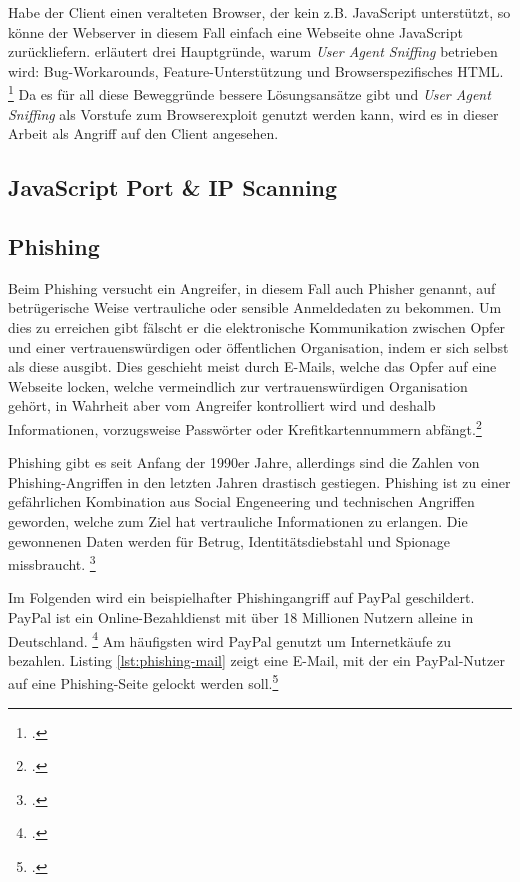 Habe der Client einen veralteten Browser, der kein z.B. JavaScript unterstützt, so könne der Webserver in diesem Fall einfach eine Webseite ohne JavaScript zurückliefern.
\cite{mdnBrowserDetection} erläutert drei Hauptgründe, warum \textit{User Agent Sniffing} betrieben wird: Bug-Workarounds, Feature-Unterstützung und Browserspezifisches HTML.
\footcite[Vgl.][]{mdnBrowserDetection}
Da es für all diese Beweggründe bessere Lösungsansätze gibt und \textit{User Agent Sniffing} als Vorstufe zum Browserexploit genutzt werden kann, wird es in dieser Arbeit als Angriff auf den Client angesehen.

\subsection{JavaScript Port \& IP Scanning}


\subsection{Phishing}

Beim Phishing versucht ein Angreifer, in diesem Fall auch Phisher genannt, auf betrügerische Weise vertrauliche oder sensible Anmeldedaten zu bekommen. Um dies zu erreichen gibt fälscht er die elektronische Kommunikation zwischen Opfer und einer vertrauenswürdigen oder öffentlichen Organisation, indem er sich selbst als diese ausgibt. Dies geschieht meist durch E-Mails, welche das Opfer auf eine Webseite locken, welche vermeindlich zur vertrauenswürdigen Organisation gehört, in Wahrheit aber vom Angreifer kontrolliert wird und deshalb Informationen, vorzugsweise Passwörter oder Krefitkartennummern abfängt.\footcite[Vgl.][1]{phishing}

Phishing gibt es seit Anfang der 1990er Jahre, allerdings sind die Zahlen von Phishing-Angriffen in den letzten Jahren drastisch gestiegen. Phishing ist zu einer gefährlichen Kombination aus Social Engeneering und technischen Angriffen geworden, welche zum Ziel hat vertrauliche Informationen zu erlangen. Die gewonnenen Daten werden für Betrug, Identitätsdiebstahl und Spionage missbraucht. \footcite[Vgl.][1\psq]{phishing}

Im Folgenden wird ein beispielhafter Phishingangriff auf PayPal geschildert. PayPal ist ein Online-Bezahldienst mit über 18 Millionen Nutzern alleine in Deutschland. \footcite[Vgl.][]{paypal} Am häufigsten wird PayPal genutzt um Internetkäufe zu bezahlen. Listing \ref{lst:phishing-mail} zeigt eine E-Mail, mit der ein PayPal-Nutzer auf eine Phishing-Seite gelockt werden soll.\footcite[Vgl.][10]{phishing}

